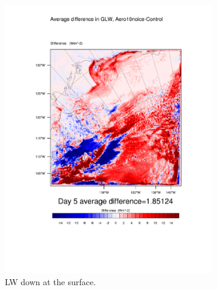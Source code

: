 \begin{figure}
	\begin{subfigure}{0.48\textwidth}
		\centering
		\includegraphics[width=\textwidth]{results/aero10ni/diff_Aero10NoIce_GLW_Day5.pdf}
		\caption{LW down at the surface.}
		\label{subfig:glw_r4Day5}
	\end{subfigure}
	\quad
	\begin{subfigure}{0.48\textwidth}
		\centering

\end{subfigure}
\end{figure}
